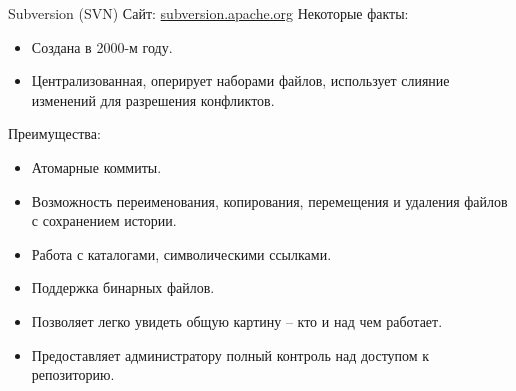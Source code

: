\documentclass[presentation]{beamer}
\begin{document}
\begin{frame}{Subversion (SVN)}
  Сайт: \url{subversion.apache.org}\newline
  Некоторые факты:
  \begin{itemize}
    \item Создана в 2000-м году.
    \item Централизованная, оперирует наборами файлов, использует
      слияние изменений для разрешения конфликтов.
  \end{itemize}
  Преимущества:
  \begin{itemize}
    \item Атомарные коммиты.
    \item Возможность переименования, копирования, перемещения и удаления
      файлов с сохранением истории.
    \item Работа с каталогами, символическими ссылками.
    \item Поддержка бинарных файлов.
    \item Позволяет легко увидеть общую картину -- кто и над чем
      работает.
    \item Предоставляет администратору полный контроль над доступом к
      репозиторию.
  \end{itemize}  
\end{frame}
\end{document}
